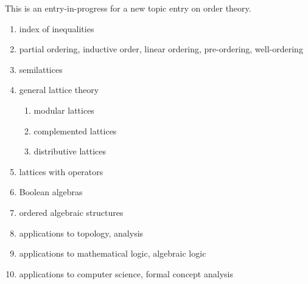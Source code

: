\documentclass[12pt]{article}
\begin{document}
This is an entry-in-progress for a new topic entry on order theory.

\begin{enumerate}
\item index of inequalities
\item partial ordering, inductive order, linear ordering, pre-ordering, well-ordering
\item semilattices
\item general lattice theory
\begin{enumerate}
\item modular lattices
\item complemented lattices
\item distributive lattices
\end{enumerate}
\item lattices with operators
\item Boolean algebras
\item ordered algebraic structures
\item applications to topology, analysis
\item applications to mathematical logic, algebraic logic
\item applications to computer science, formal concept analysis
\end{enumerate}
\end{document}
